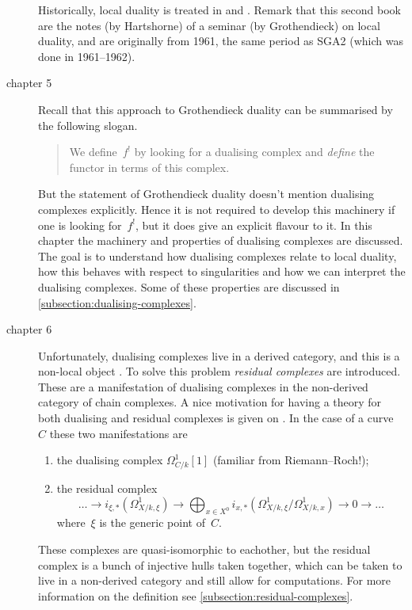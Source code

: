 \begin{description}
    Historically, local duality is treated in \cite{sga2} and \cite{hartshorne-local-cohomology}. Remark that this second book are the notes (by Hartshorne) of a seminar (by Grothendieck) on local duality, and are originally from 1961, the same period as SGA2 (which was done in 1961--1962).

  \item[chapter 5] Recall that this approach to Grothendieck duality can be summarised by the following slogan.
    \begin{quote}
      We define~$f^!$ by looking for a dualising complex and \emph{define} the functor in terms of this complex.
    \end{quote}
    But the statement of Grothendieck duality doesn't mention dualising complexes explicitly. Hence it is not required to develop this machinery if one is looking for~$f^!$, but it does give an explicit flavour to it. In this chapter the machinery and properties of dualising complexes are discussed. The goal is to understand how dualising complexes relate to local duality, how this behaves with respect to singularities and how we can interpret the dualising complexes. Some of these properties are discussed in \cref{subsection:dualising-complexes}.

  \item[chapter 6] Unfortunately, dualising complexes live in a derived category, and this is a non-local object \cite[page 193]{hartshorne-residues-and-duality}. To solve this problem \emph{residual complexes} are introduced. These are a manifestation of dualising complexes in the non-derived category of chain complexes. A nice motivation for having a theory for both dualising and residual complexes is given on \cite[pages 106--107]{conrad-grothendieck-duality-and-base-change}. In the case of a curve~$C$ these two manifestations are
    \begin{enumerate}
      \item the dualising complex $\Omega_{C/k}^1[1]$ (familiar from Riemann--Roch!);
      \item the residual complex
        \begin{equation}
          \dotso\to i_{\xi,*}\left( \Omega_{X/k,\xi}^1 \right)\to\bigoplus_{x\in X^0}i_{x,*}\left( \Omega_{X/k,\xi}^1/\Omega_{X/k,x}^1 \right)\to 0\to\dotso
        \end{equation}
        where~$\xi$ is the generic point of~$C$.
    \end{enumerate}
    These complexes are quasi-isomorphic to eachother, but the residual complex is a bunch of injective hulls taken together, which can be taken to live in a non-derived category and still allow for computations. For more information on the definition see \cref{subsection:residual-complexes}.


\end{description}
